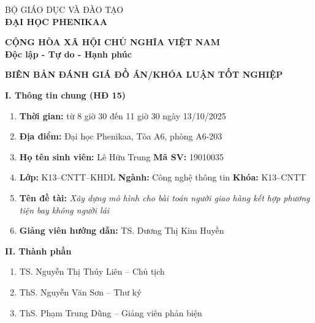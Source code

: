 \noindent
\begin{minipage}[t]{0.48\textwidth}
    \begin{center}
        BỘ GIÁO DỤC VÀ ĐÀO TẠO\\
        \textbf{ĐẠI HỌC PHENIKAA}
    \end{center}
\end{minipage}
\hfill
\begin{minipage}[t]{0.48\textwidth}
    \begin{center}
        {\fontsize{8pt}{11pt}\selectfont \textbf{CỘNG HÒA XÃ HỘI CHỦ NGHĨA VIỆT NAM}}\\
        \textbf{Độc lập - Tự do - Hạnh phúc}
    \end{center}
\end{minipage}

\vspace{0.5cm}

\begin{center}
    \textbf{\Large BIÊN BẢN ĐÁNH GIÁ ĐỒ ÁN/KHÓA LUẬN TỐT NGHIỆP}
\end{center}

\vspace{0.5cm}

\noindent\textbf{I. Thông tin chung (HĐ 15)}

\begin{enumerate}
    \item \textbf{Thời gian:} từ 8 giờ 30 đến 11 giờ 30 ngày 13/10/2025
    \item \textbf{Địa điểm:} Đại học Phenikaa, Tòa A6, phòng A6-203
    \item \textbf{Họ tên sinh viên:} Lê Hữu Trung \hfill \textbf{Mã SV:} 19010035
    \item \textbf{Lớp:} K13--CNTT--KHDL \hfill \textbf{Ngành:} Công nghệ thông tin \hfill \textbf{Khóa:} K13--CNTT
    \item \textbf{Tên đề tài:} \textit{Xây dựng mô hình cho bài toán người giao hàng kết hợp phương tiện bay không người lái}
    \item \textbf{Giảng viên hướng dẫn:} TS. Dương Thị Kim Huyền
\end{enumerate}

\vspace{0.4cm}
\noindent\textbf{II. Thành phần}

\begin{enumerate}
    \item TS. Nguyễn Thị Thúy Liên -- Chủ tịch
    \item ThS. Nguyễn Văn Sơn -- Thư ký
    \item ThS. Phạm Trung Dũng -- Giảng viên phản biện
\end{enumerate}

